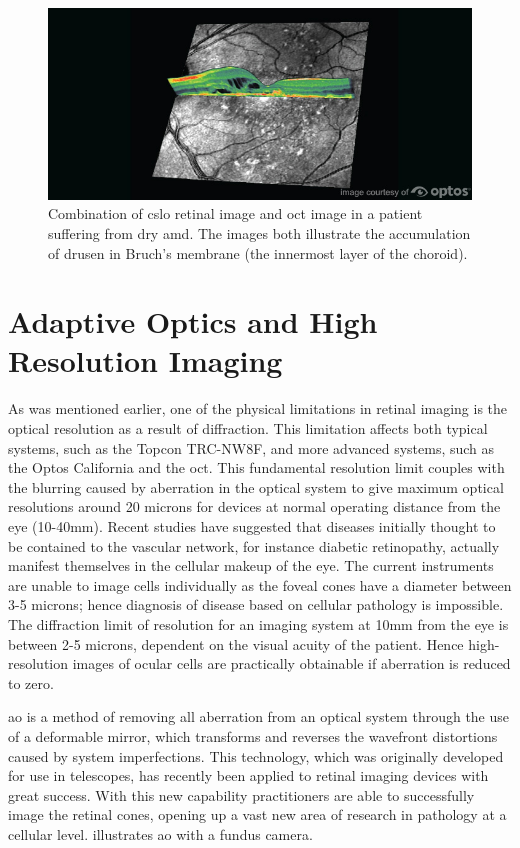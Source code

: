 \begin{figure}[H]
\centering
\includegraphics{figures/multi}
\caption{Combination of \Gls{cslo} retinal image and \Gls{oct} image in a patient
suffering from dry \Gls{amd}. The images both illustrate the accumulation of
drusen in Bruch's membrane (the innermost layer of the choroid).\cite{optos_2015}}
\label{fig:multi}
\end{figure}

\section{Adaptive Optics and High Resolution Imaging}


As was mentioned earlier, one of the physical limitations in retinal imaging is
the optical resolution as a result of diffraction. This limitation affects both
typical systems, such as the Topcon TRC-NW8F, and more advanced systems, such as
the Optos California and the \Gls{oct}. This fundamental resolution limit couples with
the blurring caused by aberration in the optical system to give maximum optical
resolutions around 20 microns for devices at normal operating distance from the
eye (10-40mm). Recent studies \cite{barber2003new} have suggested that diseases
initially thought to be contained to the vascular network, for instance diabetic
retinopathy, actually manifest themselves in the cellular makeup of the eye. The
current instruments are unable to image cells individually as the foveal cones
have a diameter between 3-5 microns; hence diagnosis of disease based on cellular
pathology is impossible. The diffraction limit of resolution for an imaging system
at 10mm from the eye is between 2-5 microns, dependent on the visual acuity of the
patient. Hence high-resolution images of ocular cells are practically obtainable
if aberration is reduced to zero.
 
\Gls{ao} is a method of removing all aberration from an optical system
through the use of a deformable mirror, which transforms and reverses the wavefront
distortions caused by system imperfections. This technology, which was originally
developed for use in telescopes, has recently been applied to retinal imaging
devices with great success. \cite{zhang2006high} With this new capability
practitioners are able to successfully image the retinal cones, opening up a vast
new area of research in pathology at a cellular level.  illustrates
\Gls{ao} with a fundus camera.

